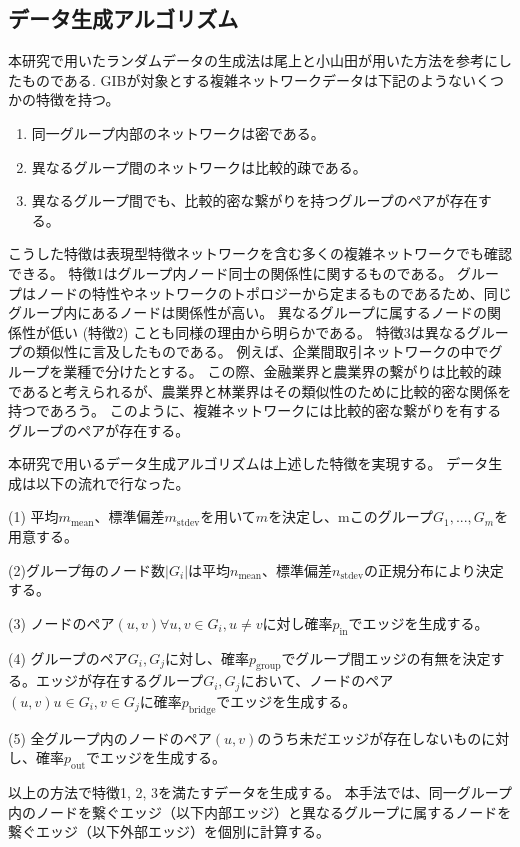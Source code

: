 \documentclass{kuee}
\begin{document}
\subsection{データ生成アルゴリズム}
\label{subsec:data_algorithm}

本研究で用いたランダムデータの生成法は尾上と小山田が用いた方法を参考にしたものである\cite{onoue2017optimal}.
GIBが対象とする複雑ネットワークデータは下記のようないくつかの特徴を持つ。
\begin{enumerate}
  \item 同一グループ内部のネットワークは密である。
  \item 異なるグループ間のネットワークは比較的疎である。
  \item 異なるグループ間でも、比較的密な繋がりを持つグループのペアが存在する。
\end{enumerate}
こうした特徴は表現型特徴ネットワークを含む多くの複雑ネットワークでも確認できる。
特徴1はグループ内ノード同士の関係性に関するものである。
グループはノードの特性やネットワークのトポロジーから定まるものであるため、同じグループ内にあるノードは関係性が高い。
異なるグループに属するノードの関係性が低い (特徴2) ことも同様の理由から明らかである。
特徴3は異なるグループの類似性に言及したものである。
例えば、企業間取引ネットワークの中でグループを業種で分けたとする。
この際、金融業界と農業界の繋がりは比較的疎であると考えられるが、農業界と林業界はその類似性のために比較的密な関係を持つであろう。
このように、複雑ネットワークには比較的密な繋がりを有するグループのペアが存在する。

本研究で用いるデータ生成アルゴリズムは上述した特徴を実現する。
データ生成は以下の流れで行なった。
\begin{description}
  \item{(1)} 平均$m_{\text{mean}}$、標準偏差$m_{\text{stdev}}$を用いて$m$を決定し、mこのグループ${G_1, ..., G_m}$を用意する。
  \item{(2)}グループ毎のノード数$|G_i|$は平均$n_{\text{mean}}$、標準偏差$n_{\text{stdev}}$の正規分布により決定する。
  \item{(3)} ノードのペア$(u, v) \forall u,v \in G_i, u \neq v$に対し確率$p_{\text{in}}$でエッジを生成する。
  \item{(4)} グループのペア$G_i, G_j$に対し、確率$p_{\text{group}}$でグループ間エッジの有無を決定する。エッジが存在するグループ$G_i, G_j$において、ノードのペア$(u, v) u \in G_i, v \in G_j$に確率$p_{\text{bridge}}$でエッジを生成する。
  \item{(5)} 全グループ内のノードのペア$(u, v)$のうち未だエッジが存在しないものに対し、確率$p_{\text{out}}$でエッジを生成する。
\end{description}
以上の方法で特徴1, 2, 3を満たすデータを生成する。
本手法では、同一グループ内のノードを繋ぐエッジ（以下内部エッジ）と異なるグループに属するノードを繋ぐエッジ（以下外部エッジ）を個別に計算する。
\end{document}
